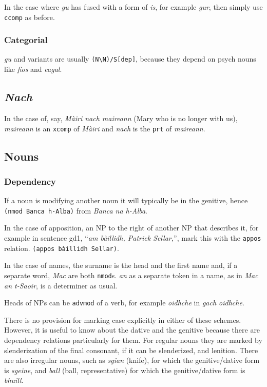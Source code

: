 \documentclass[a4paper]{article}
\begin{document}
 In the case where \textit{gu} has fused with a form of \textit{is}, for example \textit{gur}, then simply use \texttt{ccomp} as before.
\subsubsection{Categorial}
 \textit{gu} and variants are usually \texttt{(N\textbackslash N)/S[dep]}, because they depend on psych nouns like \textit{fios} and \textit{eagal}.

\subsection{\textit{Nach}}

 In the case of, say, \textit{M\`airi nach maireann} (Mary who is no longer with us), \textit{maireann} is an \texttt{xcomp} of \textit{M\`airi} and \textit{nach} is the \texttt{prt} of \textit{maireann}.


\subsection{Nouns}

\subsubsection{Dependency}
 If a noun is modifying another noun it will typically be in the genitive, hence \texttt{(nmod Banca h-Alba)} from \textit{Banca na h-Alba}.

 In the case of apposition, an NP to the right of another NP that describes it, for example in sentence gd1, ``\textit{am b\`aillidh, Patrick Sellar,}'', mark this with the \texttt{appos} relation. \texttt{(appos b\`aillidh Sellar)}. 

 In the case of names, the surname is the head and the first name and, if a separate word, \textit{Mac} are both \texttt{nmod}s. \textit{an} as a separate token in a name, as in \textit{Mac an t-Saoir}, is a determiner as usual.

 Heads of NPs can be \texttt{advmod} of a verb, for example \textit{oidhche} in \textit{gach oidhche}.

There is no provision for marking case explicitly in either of these schemes.
However, it is useful to know about the dative and the genitive because there are dependency relations particularly for them.
For regular nouns they are marked by slenderization of the final consonant, if it can be slenderized, and lenition.
There are also irregular nouns, such as \textit{sgian} (knife), for which the genitive/dative form is \textit{sgeine}, and \textit{ball} (ball, representative) for which the genitive/dative form is \textit{bhuill}.
\end{document}
